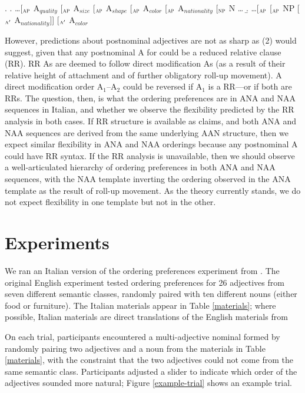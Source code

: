 \documentclass[11pt]{article}
\begin{document}
\ex.   	
\a.     	\ldots [$_\textsc{ap}$ A$_{quality}$ [$_\textsc{ap}$ A$_{size}$  [$_\textsc{ap}$ A$_{shape}$ [$_\textsc{ap}$ A$_{color}$ [$_\textsc{ap}$ A$_{nationality}$  [$_\textsc{np}$ N \ldots
\b.     	\ldots [$_\textsc{ap}$      [$_\textsc{ap}$ NP  [$_{\textsc{a}'}$ A$_{nationality}$]]  \quad   	[$_{\textsc{a}'}$ A$_{color}$    

However, predictions about postnominal adjectives are not as sharp as (2) would suggest, given that any postnominal A for \cite{cinque2010} could be a reduced relative clause (RR). RR As are deemed to follow direct modification As (as a result of their relative height of attachment and of further obligatory roll-up movement). A direct modification order A$_1$--A$_2$ could be reversed if A$_1$ is a RR---or if both are RRs. The question, then, is what the ordering preferences are in ANA and NAA sequences in Italian, and whether we observe the flexibility predicted by the RR analysis in both cases. If RR structure is available as \citeauthor{cinque2010} claims, and both ANA and NAA sequences are derived from the same underlying AAN structure, then we expect similar flexibility in ANA and NAA orderings because any postnominal A could have RR syntax. If the RR analysis is unavailable, then we should observe a well-articulated hierarchy of ordering preferences in both ANA and NAA sequences, with the NAA template inverting the ordering observed in the ANA template as the result of roll-up movement. As the theory currently stands, we do not expect flexibility in one template but not in the other.
		
		

\section{Experiments}

We ran an Italian version of the ordering preferences experiment from \cite{scontrasetal2017adjectives}. The original English experiment tested ordering preferences for 26 adjectives from seven different semantic classes, randomly paired with ten different nouns (either food or furniture). The Italian materials appear in Table \ref{materials}; where possible, Italian materials are direct translations of the English materials from \citeauthor{scontrasetal2017adjectives}

On each trial, participants encountered a multi-adjective nominal formed by randomly pairing two adjectives and a noun from the materials in Table \ref{materials}, with the constraint that the two adjectives could not come from the same semantic class. Participants adjusted a slider to indicate which order of the adjectives sounded more natural; Figure \ref{example-trial} shows an example trial.
\end{document}
